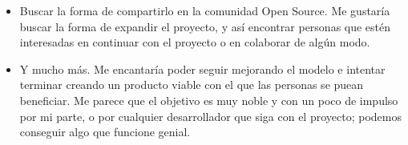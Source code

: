 \begin{itemize}
  \item Buscar la forma de compartirlo en la comunidad Open Source. Me gustaría buscar la forma de expandir el proyecto, y así encontrar personas que estén interesadas en continuar con el proyecto o en colaborar de algún modo.

  \item Y mucho más. Me encantaría poder seguir mejorando el modelo e intentar terminar creando un producto viable con el que las personas se puean beneficiar. Me parece que el objetivo es muy noble y con un poco de impulso por mi parte, o por cualquier desarrollador que siga con el proyecto; podemos conseguir algo que funcione genial.

\end{itemize}

